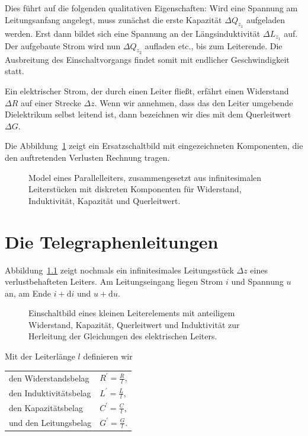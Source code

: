 \documentclass[paper=a4, parskip=half-, ngerman, fontsize=11pt]{scrreprt}
\begin{document}
Dies führt auf die folgenden qualitativen Eigenschaften: Wird eine Spannung am Leitungsanfang angelegt, muss zunächst
die erste Kapazität $\Delta Q_{z_{1}}$ aufgeladen werden. Erst dann bildet sich eine Spannung an der Längsinduktivität
$\Delta L_{z_{1}}$ auf. Der aufgebaute Strom wird nun $\Delta Q_{z_{2}}$ aufladen etc., bis zum Leiterende. Die
Ausbreitung des Einschaltvorgangs findet somit mit endlicher Geschwindigkeit statt.

Ein elektrischer Strom, der durch einen Leiter fließt, erfährt einen Widerstand $\Delta R$ auf einer Strecke
$\Delta z$. Wenn wir annehmen, dass das den Leiter umgebende Dielektrikum selbst leitend ist, dann bezeichnen wir
dies mit dem Querleitwert $\Delta G$.

Die Abbildung~\ref{Leitung3} zeigt ein Ersatzschaltbild mit eingezeichneten Komponenten, die den auftretenden Verlusten
Rechnung tragen.

\begin{figure}[htb]
    \begin{center}
        
        \caption{Model eines Parallelleiters, zusammengesetzt aus infinitesimalen Leiterstücken mit diskreten
    Komponenten für Widerstand, Induktivität, Kapazität und Querleitwert.}
        \label{Leitung3}
    \end{center}
\end{figure}



\chapter{Die Telegraphenleitungen}
Abbildung~\ref{Leitung4} zeigt nochmals ein infinitesimales Leitungsstück $\Delta z$ eines verlustbehafteten
Leiters. Am Leitungseingang liegen Strom $i$ und Spannung $u$ an, am Ende \mbox{$i + \mathrm{d} i$} und
\mbox{$u + \mathrm{d} u$}.
\begin{figure}[htb]
    \begin{center}
        
        \caption{Einschaltbild eines kleinen Leiterelements mit anteiligem Widerstand, Kapazität, Querleitwert und
        Induktivität zur Herleitung der Gleichungen des elektrischen Leiters.}
        \label{Leitung4}
    \end{center}
\end{figure}

Mit der Leiterlänge $l$ definieren wir

\begin{tabular}{l l}
    den Widerstandsbelag & $R^{\prime} = \frac{R}{l}$, \\
\addlinespace
    den Induktivitätsbelag & $L^{\prime} = \frac{L}{l}$, \\
\addlinespace
    den Kapazitätsbelag & $C^{\prime} = \frac{C}{l}$, \\
\addlinespace
    und den Leitungsbelag & $G^{\prime} = \frac{G}{l}$. \\
\end{tabular}
\end{document}

